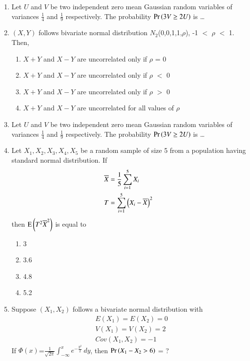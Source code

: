 \begin{enumerate}[label=\thesection.\arabic*.,ref=\thesection.\theenumi]
\item Let $U$ and $V$ be two independent zero mean Gaussian random variables of variances $\frac{1}{4}$ and $\frac{1}{9}$ respectively. The probability $\Pr\left(3V \geq 2U\right)$ is \dots
\\
\solution

%
\item $(X,Y)$ follows bivariate normal distribution $N_2$(0,0,1,1,$\rho$),  -1 $<$ $\rho$ $<$ 1. Then,
\begin{enumerate}
    \item $X+Y$ and $X-Y$ are uncorrelated only if $\rho$ = 0
    \item $X+Y$ and $X-Y$ are uncorrelated only if $\rho$ $<$ 0
    \item $X+Y$ and $X-Y$ are uncorrelated only if $\rho$ $>$ 0
    \item $X+Y$ and $X-Y$ are uncorrelated for all values of $\rho$
\end{enumerate}
\solution

%
\item Let $U$ and $V$ be two independent zero mean Gaussian random variables of variances $\frac{1}{4}$ and $\frac{1}{9}$ respectively. The probability $\Pr\left(3V \geq 2U\right)$ is \dots
\\
\solution

%
\item Let $X_1,X_2,X_3,X_4,X_5$ be a random sample of size 5 from a population having standard normal distribution. If 
\begin{align}
    \label{gauss/3/mean}
    \overline{X}&=\frac{1}{5}\sum_{i=1}^5 X_i
    \\
    T &=\sum_{i=1}^5\left(X_i-\overline{X}\right)^2
    \label{gauss/3/var}
\end{align}
%
then $\text{E}\left( T^2\overline{X}^2 \right)$ is equal to 
\begin{enumerate}
    \item 3
    \item 3.6
    \item 4.8
    \item 5.2
\end{enumerate} 
\solution

%
\item Suppose $(X_1,X_2)$ follows a bivariate  normal distribution with
\begin{align}
    &E(X_1)=E(X_2)=0\\
    &V(X_1)=V(X_2)=2\\
    &Cov(X_1,X_2)=-1
\end{align}
If $\Phi(x)$=$\frac{1}{ \sqrt{2\pi}}\int_{-\infty}^{x}e^{-\frac{{y}^2}{2}}\, dy$, then $\Pr\left(X_1-X_2>6\right)$ = ?

\end{enumerate}
